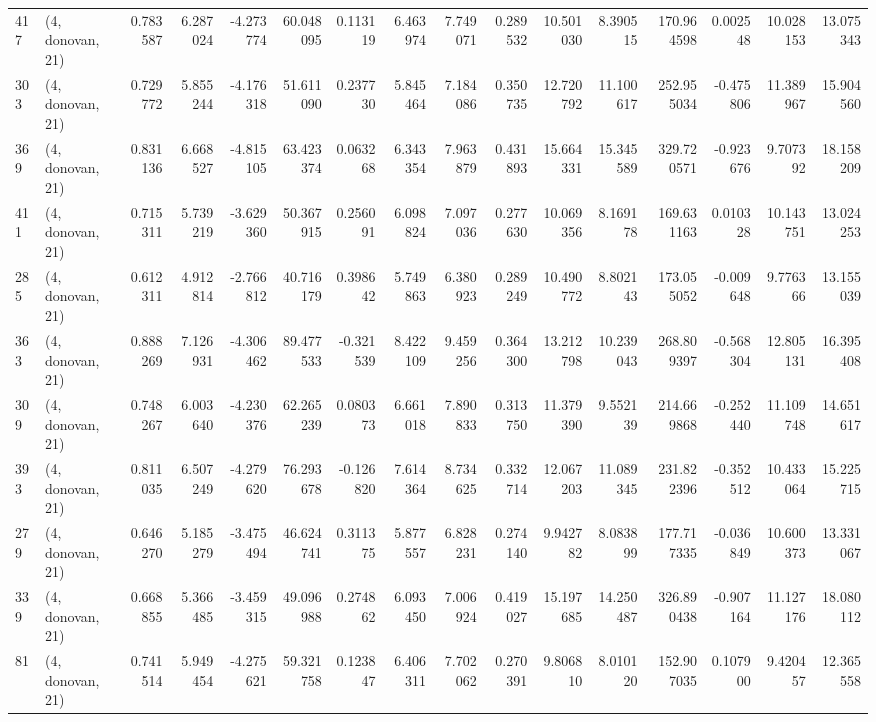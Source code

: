 \begin{tabular}{llrrrrrrrrrrrrrr}
417 &  (4, donovan, 21) &   0.783587 &   6.287024 &  -4.273774 &    60.048095 &   0.113119 &   6.463974 &   7.749071 &  0.289532 &  10.501030 &   8.390515 &   170.964598 &   0.002548 &  10.028153 &  13.075343 \\
303 &  (4, donovan, 21) &   0.729772 &   5.855244 &  -4.176318 &    51.611090 &   0.237730 &   5.845464 &   7.184086 &  0.350735 &  12.720792 &  11.100617 &   252.955034 &  -0.475806 &  11.389967 &  15.904560 \\
369 &  (4, donovan, 21) &   0.831136 &   6.668527 &  -4.815105 &    63.423374 &   0.063268 &   6.343354 &   7.963879 &  0.431893 &  15.664331 &  15.345589 &   329.720571 &  -0.923676 &   9.707392 &  18.158209 \\
411 &  (4, donovan, 21) &   0.715311 &   5.739219 &  -3.629360 &    50.367915 &   0.256091 &   6.098824 &   7.097036 &  0.277630 &  10.069356 &   8.169178 &   169.631163 &   0.010328 &  10.143751 &  13.024253 \\
285 &  (4, donovan, 21) &   0.612311 &   4.912814 &  -2.766812 &    40.716179 &   0.398642 &   5.749863 &   6.380923 &  0.289249 &  10.490772 &   8.802143 &   173.055052 &  -0.009648 &   9.776366 &  13.155039 \\
363 &  (4, donovan, 21) &   0.888269 &   7.126931 &  -4.306462 &    89.477533 &  -0.321539 &   8.422109 &   9.459256 &  0.364300 &  13.212798 &  10.239043 &   268.809397 &  -0.568304 &  12.805131 &  16.395408 \\
309 &  (4, donovan, 21) &   0.748267 &   6.003640 &  -4.230376 &    62.265239 &   0.080373 &   6.661018 &   7.890833 &  0.313750 &  11.379390 &   9.552139 &   214.669868 &  -0.252440 &  11.109748 &  14.651617 \\
393 &  (4, donovan, 21) &   0.811035 &   6.507249 &  -4.279620 &    76.293678 &  -0.126820 &   7.614364 &   8.734625 &  0.332714 &  12.067203 &  11.089345 &   231.822396 &  -0.352512 &  10.433064 &  15.225715 \\
279 &  (4, donovan, 21) &   0.646270 &   5.185279 &  -3.475494 &    46.624741 &   0.311375 &   5.877557 &   6.828231 &  0.274140 &   9.942782 &   8.083899 &   177.717335 &  -0.036849 &  10.600373 &  13.331067 \\
339 &  (4, donovan, 21) &   0.668855 &   5.366485 &  -3.459315 &    49.096988 &   0.274862 &   6.093450 &   7.006924 &  0.419027 &  15.197685 &  14.250487 &   326.890438 &  -0.907164 &  11.127176 &  18.080112 \\
81  &  (4, donovan, 21) &   0.741514 &   5.949454 &  -4.275621 &    59.321758 &   0.123847 &   6.406311 &   7.702062 &  0.270391 &   9.806810 &   8.010120 &   152.907035 &   0.107900 &   9.420457 &  12.365558 \\

\end{tabular}
